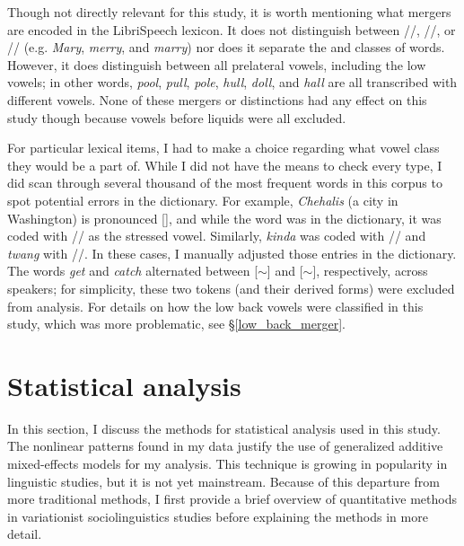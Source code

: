Though not directly relevant for this study, it is worth mentioning what mergers are encoded in the LibriSpeech lexicon. It does not distinguish between //, //, or // (e.g. \textit{Mary}, \textit{merry}, and \textit{marry}) nor does it separate the \north and \force classes of words. However, it does distinguish between all prelateral vowels, including the low vowels; in other words, \textit{pool}, \textit{pull}, \textit{pole}, \textit{hull}, \textit{doll}, and \textit{hall} are all transcribed with different vowels. None of these mergers or distinctions had any effect on this study though because vowels before liquids were all excluded.

For particular lexical items, I had to make a choice regarding what vowel class they would be a part of. While I did not have the means to check every type, I did scan through several thousand of the most frequent words in this corpus to spot potential errors in the dictionary. For example, \textit{Chehalis} (a city in Washington) is pronounced [], and while the word was in the dictionary, it was coded with // as the stressed vowel. Similarly, \textit{kinda} was coded with // and \textit{twang} with //. In these cases, I manually adjusted those entries in the dictionary. The words \textit{get} and \textit{catch} alternated between [$\sim$] and [$\sim$\textipa{\ae}], respectively, across speakers; for simplicity, these two tokens (and their derived forms) were excluded from analysis. For details on how the low back vowels were classified in this study, which was more problematic, see \S\ref{low_back_merger}.





\section{Statistical analysis}
\label{statistical_analysis}

In this section, I discuss the methods for statistical analysis used in this study. The nonlinear patterns found in my data justify the use of generalized additive mixed-effects models for my analysis. This technique is growing in popularity in linguistic studies, but it is not yet mainstream. Because of this departure from more traditional methods, I first provide a brief overview of quantitative methods in variationist sociolinguistics studies before explaining the methods in more detail.

